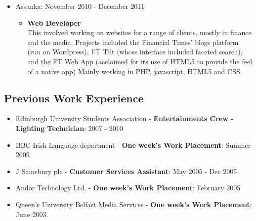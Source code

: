 \documentclass[a4paper]{article}
\begin{document}
\begin{itemize}
\item Assanka: November 2010 - December 2011
\begin{itemize}\item
 {\bf Web Developer}\\
This involved working on websites for a range of clients, mostly in finance and the media.  Projects included the Financial Times' blogs platform (run on Wordpress), FT Tilt (whose interface included faceted search), and the FT Web App (acclaimed for its use of HTML5 to provide the feel of a native app)  Mainly working in PHP, javascript, HTML5 and CSS
\end{itemize}

\end{itemize}

\subsection*{Previous Work Experience}
\begin{itemize}

\item Edinburgh University Students Association - {\bf Entertainments Crew - Lighting Technician}: 2007 - 2010
\item BBC Irish Language department - {\bf One week's Work Placement}: Summer 2009
\item J Sainsbury plc - {\bf Customer Services Assistant}: May 2005 - Dec 2005
\item Andor Technology Ltd. - {\bf One week's Work Placement}:  February 2005
\item Queen's University Belfast Media Services - {\bf One week's Work Placement}:  June 2003.


\end{itemize}
\end{document}
